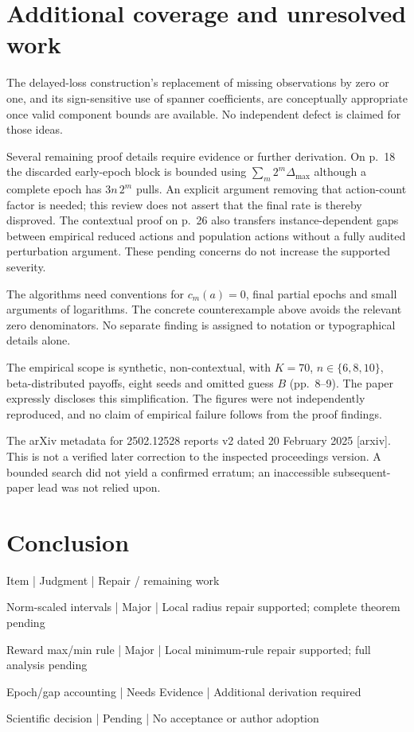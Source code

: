 \documentclass[10pt]{article}
\begin{document}
\section*{Additional coverage and unresolved work}
The delayed-loss construction’s replacement of missing observations by zero or one, and its sign-sensitive use of spanner coefficients, are conceptually appropriate once valid component bounds are available. No independent defect is claimed for those ideas.\par
Several remaining proof details require evidence or further derivation. On p. 18 the discarded early-epoch block is bounded using \(\sum_m2^m\Delta_{\max}\) although a complete epoch has \(3n\,2^m\) pulls. An explicit argument removing that action-count factor is needed; this review does not assert that the final rate is thereby disproved. The contextual proof on p. 26 also transfers instance-dependent gaps between empirical reduced actions and population actions without a fully audited perturbation argument. These pending concerns do not increase the supported severity.\par
The algorithms need conventions for \(c_m(a)=0\), final partial epochs and small arguments of logarithms. The concrete counterexample above avoids the relevant zero denominators. No separate finding is assigned to notation or typographical details alone.\par
The empirical scope is synthetic, non-contextual, with \(K=70\), \(n\in\{6,8,10\}\), beta-distributed payoffs, eight seeds and omitted guess \(B\) (pp. 8–9). The paper expressly discloses this simplification. The figures were not independently reproduced, and no claim of empirical failure follows from the proof findings.\par
The arXiv metadata for 2502.12528 reports v2 dated 20 February 2025 [arxiv]. This is not a verified later correction to the inspected proceedings version. A bounded search did not yield a confirmed erratum; an inaccessible subsequent-paper lead was not relied upon.\par
\section*{Conclusion}
Item | Judgment | Repair / remaining work\par
Norm-scaled intervals | Major | Local radius repair supported; complete theorem pending\par
Reward max/min rule | Major | Local minimum-rule repair supported; full analysis pending\par
Epoch/gap accounting | Needs Evidence | Additional derivation required\par
Scientific decision | Pending | No acceptance or author adoption\par
\end{document}
